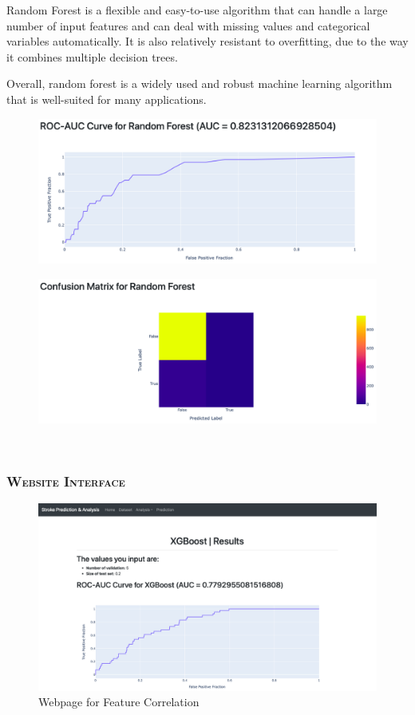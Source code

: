 \documentclass[a4paper,12pt]{article}
\begin{document}
Random Forest is a flexible and easy-to-use algorithm that can handle a large number of input features and can deal with missing values and categorical variables automatically. It is also relatively resistant to overfitting, due to the way it combines multiple decision trees.

Overall, random forest is a widely used and robust machine learning algorithm that is well-suited for many applications.

\begin{figure}[h] 
    \centering
    \includegraphics[width=1\textwidth]{rfst_p1} 
\end{figure}

\begin{figure}[h] 
    \centering
    \includegraphics[width=1\textwidth]{rfst_p2} 
\end{figure}
~
\newpage
\subsubsection{\textsc{Website Interface}}
\begin{figure}[h] 
    \centering
    \includegraphics[width=1\textwidth]{home_p8} 
    \caption{Webpage for Feature Correlation} 
\end{figure}
\end{document}
